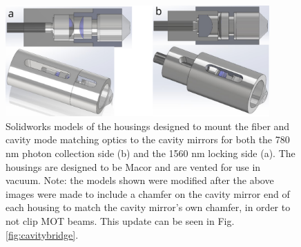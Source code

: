 \begin{figure}[!ht]
    \centering
    \includegraphics[width=0.9\textwidth]{Images/mode_matching_housings.pdf}
    \caption{Solidworks models of the housings designed to mount the fiber and cavity mode matching optics to the cavity mirrors for both the 780 nm photon collection side (b) and the 1560 nm locking side (a). The housings are designed to be Macor and are vented for use in vacuum. Note: the models shown were modified after the above images were made to include a chamfer on the cavity mirror end of each housing to match the cavity mirror's own chamfer, in order to not clip MOT beams. This update can be seen in Fig. \ref{fig:cavitybridge}.}
    \label{fig:modematchhousings}
\end{figure}

